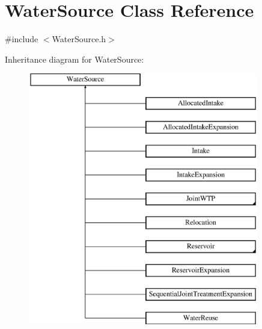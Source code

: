 \hypertarget{classWaterSource}{}\section{Water\+Source Class Reference}
\label{classWaterSource}


{\ttfamily \#include $<$Water\+Source.\+h$>$}

Inheritance diagram for Water\+Source\+:\begin{figure}[H]
\begin{center}
\leavevmode
\includegraphics[height=11.000000cm]{classWaterSource}
\end{center}
\end{figure}

